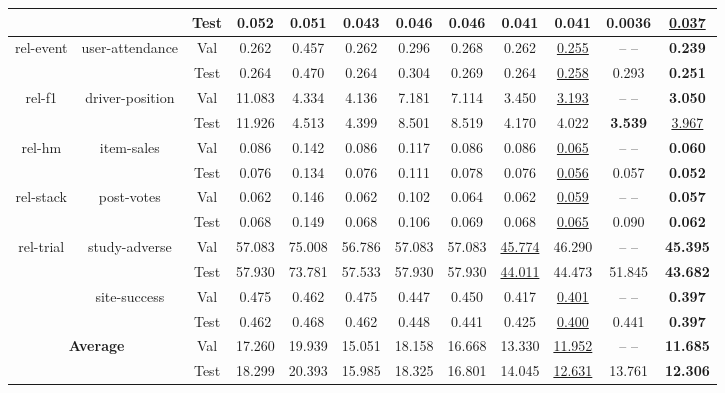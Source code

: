 \documentclass[11pt]{article}
\begin{document}
\begin{table}[t]
{\begin{tabular}{ccccccccccc|c}
     & & Test & 0.052 & 0.051 & 0.043 & 0.046 & 0.046 & 0.041 & {0.041} & \textbf{0.0036} & \underline{0.037} \\ \midrule
     \multirow{2}{*}{rel-event} & \multirow{2}{*}{user-attendance} & Val & 0.262 & 0.457 & 0.262 & 0.296 & 0.268 & 0.262 & \underline{0.255} &  -- -- & \textbf{0.239} \\
     & & Test & 0.264 & 0.470 & 0.264 & 0.304 & 0.269 & 0.264 & \underline{0.258} & 0.293 & \textbf{0.251}  \\ \midrule %
     \multirow{2}{*}{rel-f1} & \multirow{2}{*}{driver-position} & Val & 11.083 & 4.334 & 4.136 & 7.181 & 7.114 & 3.450 & \underline{3.193} &  -- -- & \textbf{3.050} \\
     & & Test & 11.926 & 4.513 & 4.399 & 8.501 & 8.519 & 4.170 & {4.022} & \textbf{3.539} & \underline{3.967} \\ \midrule
     \multirow{2}{*}{rel-hm} & \multirow{2}{*}{item-sales} & Val & 0.086 & 0.142 & 0.086 & 0.117 & 0.086 & 0.086 & \underline{0.065} &  -- -- & \textbf{0.060} \\
     & & Test & 0.076 & 0.134 & 0.076 & 0.111 & 0.078 & 0.076 & \underline{0.056} & 0.057 & \textbf{0.052} \\ \midrule
     \multirow{2}{*}{rel-stack} & \multirow{2}{*}{post-votes} & Val & 0.062 & 0.146 & 0.062 & 0.102 & 0.064 & 0.062 & \underline{0.059} &  -- -- & \textbf{0.057} \\
     & & Test & 0.068 & 0.149 & 0.068 & 0.106 & 0.069 & 0.068 & \underline{0.065} & 0.090 & \textbf{0.062} \\ \midrule
     \multirow{4}{*}{rel-trial} & \multirow{2}{*}{study-adverse} & Val & 57.083 & 75.008 & 56.786 & 57.083 & 57.083 &  \underline{45.774} & {46.290} &  -- -- & \textbf{45.395}  \\
     & & Test & 57.930 & 73.781 & 57.533 & 57.930 & 57.930 & \underline{44.011} & {44.473} & 51.845 & \textbf{43.682} \\
     & \multirow{2}{*}{site-success} & Val & 0.475 & 0.462 & 0.475 & 0.447 & 0.450 & 0.417 & \underline{0.401} &  -- -- & \textbf{0.397} \\
     & & Test & 0.462 & 0.468 & 0.462 & 0.448 & 0.441 & 0.425 & \underline{0.400} & 0.441 & \textbf{0.397} \\ \midrule
     \multicolumn{2}{c}{\multirow{2}{*}{\textbf{Average}}} & Val & 17.260 & 19.939 & 15.051 & 18.158 & 16.668 & 13.330 & \underline{11.952} &  -- -- & \textbf{11.685} \\
     & & Test & 18.299 & 20.393 & 15.985 & 18.325 & 16.801 & 14.045 & \underline{12.631} & 13.761 & \textbf{12.306} \\ \bottomrule 
    \end{tabular}}
    \label{tab: reg}
\end{table}
\end{document}
